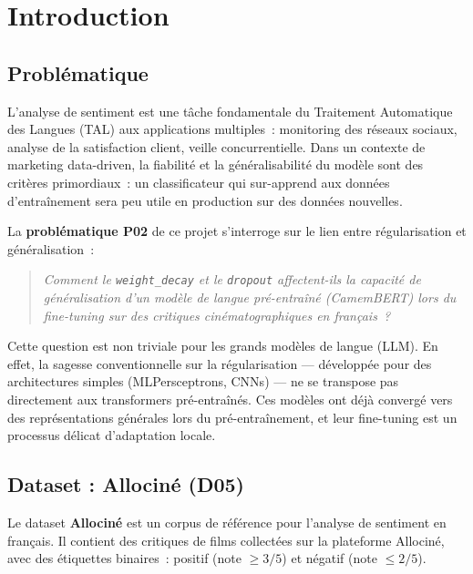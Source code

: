 \documentclass[12pt,a4paper]{article}
\begin{document}
\tableofcontents
\newpage

\section{Introduction}
\label{sec:introduction}

\subsection{Problématique}
\label{ssec:problematique}

L'analyse de sentiment est une tâche fondamentale du Traitement Automatique des
Langues (TAL) aux applications multiples~: monitoring des réseaux sociaux, analyse
de la satisfaction client, veille concurrentielle. Dans un contexte de marketing
data-driven, la fiabilité et la généralisabilité du modèle sont des critères
primordiaux~: un classificateur qui sur-apprend aux données d'entraînement sera
peu utile en production sur des données nouvelles.

La \textbf{problématique P02} de ce projet s'interroge sur le lien entre
régularisation et généralisation~:

\begin{quote}
\textit{Comment le \texttt{weight\_decay} et le \texttt{dropout} affectent-ils
la capacité de généralisation d'un modèle de langue pré-entraîné (CamemBERT)
lors du fine-tuning sur des critiques cinématographiques en français~?}
\end{quote}

Cette question est non triviale pour les grands modèles de langue (LLM). En effet,
la sagesse conventionnelle sur la régularisation — développée pour des architectures
simples (MLPersceptrons, CNNs) — ne se transpose pas directement aux transformers
pré-entraînés. Ces modèles ont déjà convergé vers des représentations générales lors
du pré-entraînement, et leur fine-tuning est un processus délicat d'adaptation locale.

\subsection{Dataset : Allociné (D05)}
\label{ssec:dataset}

Le dataset \textbf{Allociné} \citep{maas-allocine-2020} est un corpus de référence
pour l'analyse de sentiment en français. Il contient des critiques de films collectées
sur la plateforme Allociné, avec des étiquettes binaires~: positif (note $\geq 3/5$)
et négatif (note $\leq 2/5$).
\end{document}
